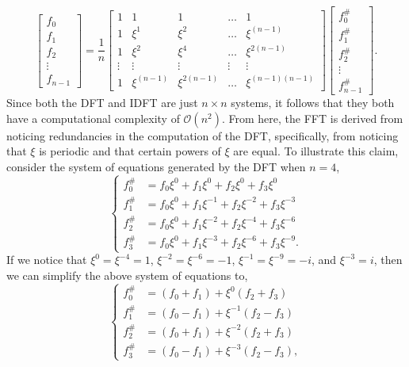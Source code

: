 \documentclass[11pt]{article}
\begin{document}
\begin{equation*}
	\begin{bmatrix}
		f_{0} \\
		f_{1} \\
		f_{2} \\
		\vdots \\
		f_{n-1}
	\end{bmatrix}
	=
	\frac{1}{n}
	\begin{bmatrix}
		1 & 1 & 1 & \dots & 1 \\
		1 & \xi^{1} & \xi^{2} & \dots & \xi^{(n-1)} \\
		1 & \xi^{2} & \xi^{4} & \dots & \xi^{2(n-1)} \\
		\vdots & \vdots & \vdots & \vdots & \vdots \\
		1 & \xi^{(n-1)} & \xi^{2(n-1)} & \dots & \xi^{(n-1)(n-1)} 
	\end{bmatrix}
	\begin{bmatrix}
		f_{0}^{\#} \\
		f_{1}^{\#} \\
		f_{2}^{\#} \\
		\vdots \\
		f_{n-1}^{\#}
	\end{bmatrix}.
\end{equation*}
Since both the DFT and IDFT are just $n \times n$ systems,
it follows that they both have a computational complexity of $\mathcal{O}(n^2)$.
From here, the FFT is derived from noticing redundancies in the computation of the DFT, specifically,
from noticing that $\xi$ is periodic and that certain powers of $\xi$ are equal. To illustrate this claim,
consider the system of equations generated by the DFT when $n = 4$,
\begin{equation*}
	\begin{cases}
		f_{0}^{\#} &= f_0\xi^0 + f_1\xi^0 + f_2\xi^0 + f_3\xi^0 \\
		f_{1}^{\#} &= f_0\xi^0 + f_1\xi^{-1} + f_2\xi^{-2} + f_3\xi^{-3} \\
		f_{2}^{\#} &= f_0\xi^0 + f_1\xi^{-2} + f_2\xi^{-4} + f_3\xi^{-6} \\
		f_{3}^{\#} &= f_0\xi^0 + f_1\xi^{-3} + f_2\xi^{-6} + f_3\xi^{-9}.
	\end{cases}
\end{equation*}
If we notice that $\xi^0 = \xi^{-4} = 1$, $\xi^{-2} = \xi^{-6} = -1$, $\xi^{-1} = \xi^{-9} = -i$, and $\xi^{-3} = i$,
then we can simplify the above system of equations to,
\begin{equation*}
	\begin{cases}
		f_{0}^{\#} &= (f_0 + f_1) + \xi^0(f_2 + f_3) \\
		f_{1}^{\#} &= (f_0 - f_1) + \xi^{-1}(f_2 - f_3) \\
		f_{2}^{\#} &= (f_0 + f_1) + \xi^{-2}(f_2 + f_3) \\
		f_{3}^{\#} &= (f_0 - f_1) + \xi^{-3}(f_2 - f_3),
	\end{cases}
\end{equation*}
\end{document}
